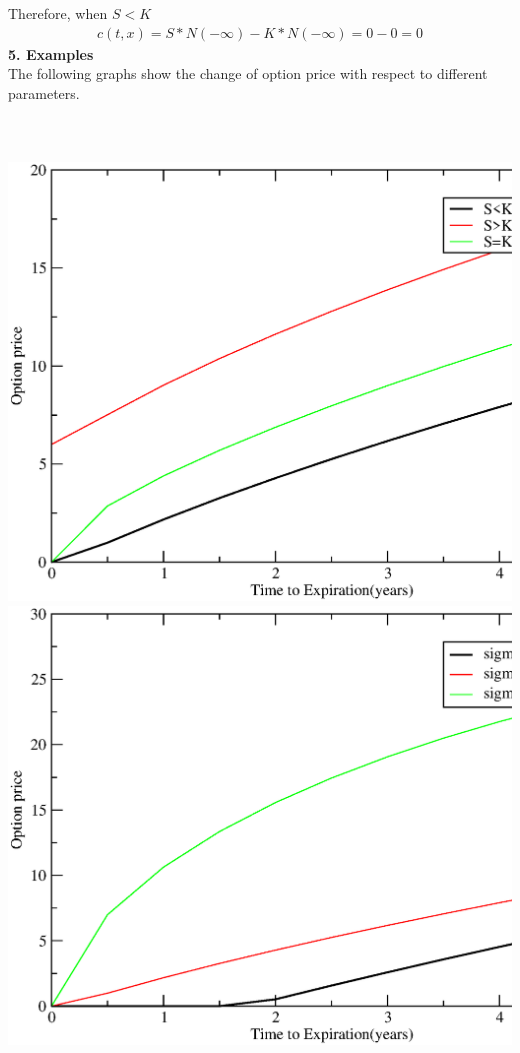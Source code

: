 \documentclass[a4paper]{article}
\begin{document}
Therefore, when $S<K$
\begin{align*}
	c(t,x) = S*N(-\infty) - K*N(-\infty) = 0-0 = 0
\end{align*}
{\bf 5. Examples}\\
The following graphs show the change of option price with respect to different parameters.
\\
\\
\\
\\
\includegraphics[scale = 0.5]{option_price1.eps}\\
\includegraphics[scale = 0.5]{option_price2.eps}\\
\end{document}
